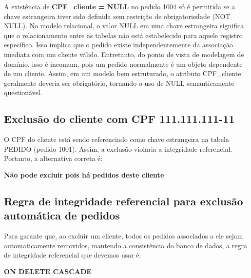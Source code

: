 \documentclass[12pt,a4paper]{article}
\begin{document}
A existência de \textbf{CPF\_cliente = NULL} no pedido 1004 só é permitida se a chave estrangeira tiver sido definida sem restrição de obrigatoriedade (NOT NULL). No modelo relacional, o valor NULL em uma chave estrangeira significa que o relacionamento entre as tabelas não está estabelecido para aquele registro específico. Isso implica que o pedido existe independentemente da associação imediata com um cliente válido. Entretanto, do ponto de vista de modelagem de domínio, isso é incomum, pois um pedido normalmente é um objeto dependente de um cliente. Assim, em um modelo bem estruturado, o atributo CPF\_cliente geralmente deveria ser obrigatório, tornando o uso de NULL semanticamente questionável.

\subsection{Exclusão do cliente com CPF 111.111.111-11}

O CPF do cliente está sendo referenciado como chave estrangeira na tabela PEDIDO (pedido 1001). Assim, a exclusão violaria a integridade referencial. Portanto, a alternativa correta é:

\textbf{Não pode excluir pois há pedidos deste cliente}

\subsection{Regra de integridade referencial para exclusão automática de pedidos}

Para garante que, ao excluir um cliente, todos os pedidos associados a ele sejam automaticamente removidos, mantendo a consistência do banco de dados, a regra de integridade referencial que devemos usar é:

\textbf{ON DELETE CASCADE}
\end{document}
